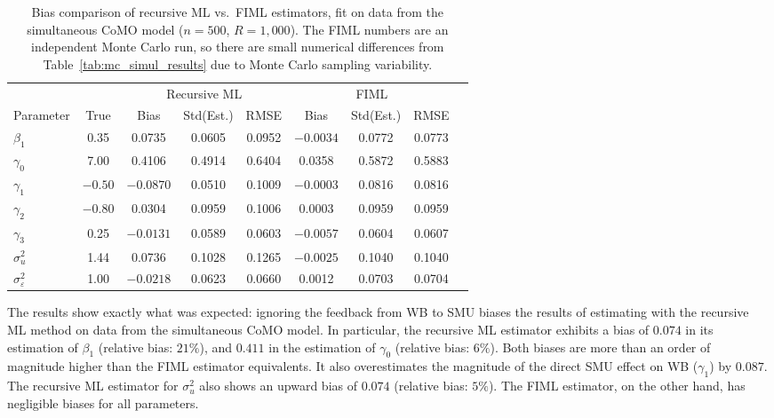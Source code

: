 \begin{table}[htbp]
\centering
\caption[Bias comparison of recursive ML vs.\ FIML estimators]{Bias comparison of recursive ML vs.\ FIML estimators, fit on data from the simultaneous CoMO model ($n = 500$, $R = 1{,}000$). The FIML numbers are an independent Monte Carlo run, so there are small numerical differences from Table~\ref{tab:mc_simul_results} due to Monte Carlo sampling variability.}
\label{tab:mc_bias_comparison}
\begin{tabular}{lcccccccc}
\toprule
& & \multicolumn{3}{c}{Recursive ML} & \multicolumn{3}{c}{FIML} \\
\cmidrule(lr){3-5} \cmidrule(lr){6-8}
Parameter & True & Bias & Std(Est.) & RMSE & Bias & Std(Est.) & RMSE \\
\midrule
$\beta_1$ & 0.35 & 0.0735 & 0.0605 & 0.0952 & $-0.0034$ & 0.0772 & 0.0773 \\
$\gamma_0$ & 7.00 & 0.4106 & 0.4914 & 0.6404 & 0.0358 & 0.5872 & 0.5883 \\
$\gamma_1$ & $-0.50$ & $-0.0870$ & 0.0510 & 0.1009 & $-0.0003$ & 0.0816 & 0.0816 \\
$\gamma_2$ & $-0.80$ & 0.0304 & 0.0959 & 0.1006 & 0.0003 & 0.0959 & 0.0959 \\
$\gamma_3$ & 0.25 & $-0.0131$ & 0.0589 & 0.0603 & $-0.0057$ & 0.0604 & 0.0607 \\
$\sigma_u^2$ & 1.44 & 0.0736 & 0.1028 & 0.1265 & $-0.0025$ & 0.1040 & 0.1040 \\
$\sigma_\varepsilon^2$ & 1.00 & $-0.0218$ & 0.0623 & 0.0660 & 0.0012 & 0.0703 & 0.0704 \\
\bottomrule
\end{tabular}
\end{table}

The results show exactly what was expected: ignoring the feedback from WB to SMU biases the results of estimating with the recursive ML method on data from the simultaneous CoMO model. In particular, the recursive ML estimator exhibits a bias of $0.074$ in its estimation of $\beta_1$ (relative bias: $21\%$), and $0.411$ in the estimation of $\gamma_0$ (relative bias: $6\%$). Both biases are more than an order of magnitude higher than the FIML estimator equivalents. It also overestimates the magnitude of the direct SMU effect on WB ($\gamma_1$) by $0.087$. The recursive ML estimator for $\sigma_u^2$ also shows an upward bias of $0.074$ (relative bias: $5\%$). The FIML estimator, on the other hand, has negligible biases for all parameters.

